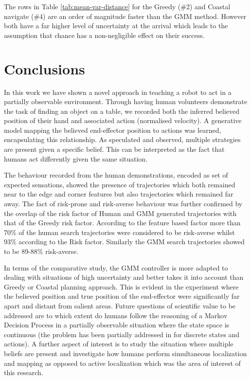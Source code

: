 The rows in Table \ref{tab:mean-var-distance} for the Greedy (\#2) and Coastal navigate (\#4) are an order of magnitude faster than the GMM method. 
However both have a far higher level of uncertainty at the arrival which leads to the assumption that chance has a non-negligible effect on their 
success. 





\section{Conclusions}

In this work we have shown a novel approach in teaching a robot to act in a partially observable environment. 
Through having human volunteers demonstrate the task of finding an object on a table, we recorded both the 
inferred believed position of their hand and associated action (normalised velocity). A generative model
mapping the believed end-effector position to actions was learned, encapsulating this relationship. 
As speculated and observed, multiple strategies are present given a specific belief. This can be interpreted as the fact that 
humans act differently given the same situation. 

The behaviour recorded from the human demonstrations, encoded as set of expected sensations, showed
the presence of trajectories which both remained near to the edge and corner features but also 
trajectories which remained far away. The fact of risk-prone and risk-averse behaviour was further 
confirmed by the overlap of the risk factor of Human and GMM generated trajectories with that of the Greedy
risk factor. According to the feature based factor more than 70\% of the human search trajectories were considered
to be risk-averse whilst 93\% according to the Risk factor. Similarly the GMM search trajectories showed to be
89-88\% risk-averse.

In terms of the comparative study, the GMM controller is more adapted to dealing with situations of high uncertainty and 
better takes it into account than Greedy or Coastal planning approach. This is evident in the experiment
where the believed position and true position of the end-effector were significantly far apart and distant from salient areas. 
Future questions of scientific value to be addressed are to which extent do humans follow the reasoning 
of a Markov Decision Process in a partially observable situation where the state space is continuous 
(the problem has been partially addressed in \cite{Bake_Saxe_Tene_2011} for discrete states and actions). A further aspect of interest
is to study the situation where multiple beliefs are present and investigate how humans 
perform simultaneous localization and mapping as opposed to active localization which was the area of interest of 
this research. 